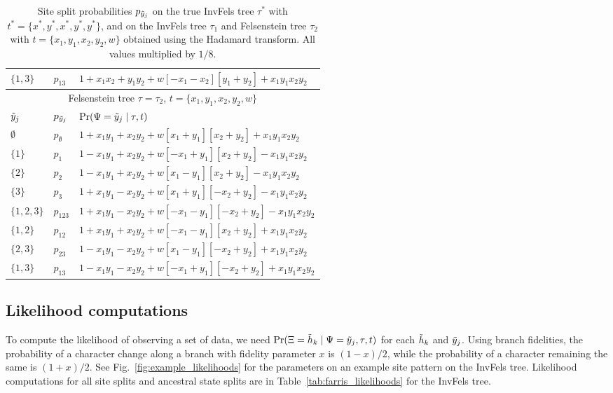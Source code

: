 \begin{table}[ht]
\begin{tabular}{|l|l|l|}
    $\{1,3\}$   & $p_{13}$          &$1 + x_1x_2 +  y_1y_2 +  w[- x_1 - x_2][  y_1 + y_2] + x_1y_1x_2y_2$\\
    \hline
    \multicolumn{3}{c}{Felsenstein tree $\tau=\tau_2$, $t=\{x_1,y_1,x_2,y_2,w\}$}\\
    \hline
$\tilde{y}_j$  & $p_{\tilde{y}_j}$ &$\Pr(\Psi=\tilde{y}_j \mid \tau,t)$\\
    \hline
    $\emptyset$ & $p_{\emptyset}$   &$1 + x_1y_1 +  x_2y_2 +  w[  x_1 + y_1][  x_2 + y_2] + x_1y_1x_2y_2$\\
    $\{1\}$     & $p_{1}$           &$1 - x_1y_1 +  x_2y_2 +  w[ -x_1 + y_1][  x_2 + y_2] - x_1y_1x_2y_2$\\
    $\{2\}$     & $p_{2}$           &$1 - x_1y_1 +  x_2y_2 +  w[  x_1 - y_1][  x_2 + y_2] - x_1y_1x_2y_2$\\
    $\{3\}$     & $p_{3}$           &$1 + x_1y_1 -  x_2y_2 +  w[  x_1 + y_1][ -x_2 + y_2] - x_1y_1x_2y_2$\\
    $\{1,2,3\}$ & $p_{123}$         &$1 + x_1y_1 -  x_2y_2 +  w[ -x_1 - y_1][ -x_2 + y_2] - x_1y_1x_2y_2$\\
    $\{1,2\}$   & $p_{12}$          &$1 + x_1y_1 +  x_2y_2 +  w[ -x_1 - y_1][  x_2 + y_2] + x_1y_1x_2y_2$\\
    $\{2,3\}$   & $p_{23}$          &$1 - x_1y_1 -  x_2y_2 +  w[  x_1 - y_1][ -x_2 + y_2] + x_1y_1x_2y_2$\\
    $\{1,3\}$   & $p_{13}$          &$1 - x_1y_1 -  x_2y_2 +  w[ -x_1 + y_1][ -x_2 + y_2] + x_1y_1x_2y_2$\\
    \hline
\end{tabular}
\caption{Site split probabilities $p_{\tilde{y}_j}$ on the true InvFels tree $\tau^*$ with $t^*=\{x^*,y^*,x^*,y^*,y^*\}$, and on the InvFels tree $\tau_1$ and Felsenstein tree $\tau_2$ with $t=\{x_1,y_1,x_2,y_2,w\}$ obtained using the Hadamard transform.
All values multiplied by $1/8$.}
\label{tab:gen-sitepatprob}
\end{table}

\subsection*{Likelihood computations}

To compute the likelihood of observing a set of data, we need $\Pr(\Xi=\tilde{h}_k \mid \Psi=\tilde{y}_j, \tau, t)$ for each $\tilde{h}_k$ and $\tilde{y}_j$.
Using branch fidelities, the probability of a character change along a branch with fidelity parameter $x$ is $(1-x)/2$, while the probability of a character remaining the same is $(1+x)/2$.
See Fig.~\ref{fig:example_likelihoods} for the parameters on an example site pattern on the InvFels tree.
Likelihood computations for all site splits and ancestral state splits are in Table~\ref{tab:farris_likelihoods} for the InvFels tree.

